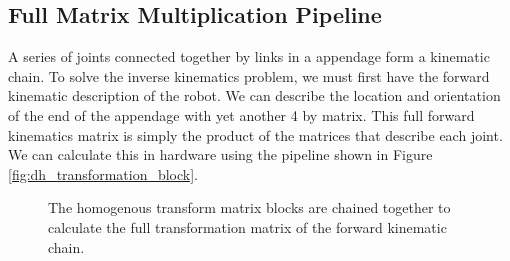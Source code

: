 \subsection{Full Matrix Multiplication Pipeline}

A series of joints connected together by links in a appendage form a kinematic chain. To solve the inverse kinematics problem, we must first have the forward kinematic description of the robot. We can describe the location and orientation of the end of the appendage with yet another 4 by matrix. This full forward kinematics matrix is simply the product of the matrices that describe each joint. We can calculate this in hardware using the pipeline shown in Figure \ref{fig:dh_transformation_block}.

\begin{figure}[ht]
\center
{}
\caption{The homogenous transform matrix blocks are chained together to calculate the full transformation matrix of the forward kinematic chain.}
\label{fig:dh_transform_pipeline}
\end{figure}
